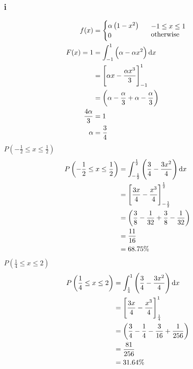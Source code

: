 \documentclass[11pt]{article}
\numberwithin{equation}{section}
\begin{document}
\subsubsection{i}
\begin{align}
    f(x) &= \begin{cases}
        \alpha \left(1 - x^2\right)\\
        0 
    \end{cases} \begin{array}{l}
        -1 \leq x \leq 1\\
        \textrm{otherwise}
    \end{array}\\
    F(x) = 1 &= \int_{-1}^1 \left(\alpha - \alpha x^2\right) \dif x\\
    &= \left[\alpha x - \frac{\alpha x^3}{3}\right]_{-1}^{1}\\
    &= \left(\alpha - \frac{\alpha}{3} + \alpha -\frac{\alpha}{3} \right)\\
    \frac{4\alpha}{3} &= 1\\
    \alpha &= \frac{3}{4}
\end{align}
$P\left(-\frac{1}{2} \leq x \leq \frac{1}{2} \right)$
\begin{align}
    P\left(-\frac{1}{2} \leq x \leq \frac{1}{2} \right) &= \int_{-\frac{1}{2}}^{\frac{1}{2}} \left(\frac{3}{4} - \frac{3x^2}{4}\right) \dif x\\
    &= \left[\frac{3x}{4} - \frac{x^3}{4}\right]_{-\frac{1}{2}}^{\frac{1}{2}}\\
    &= \left(\frac{3}{8} - \frac{1}{32} + \frac{3}{8} - \frac{1}{32} \right)\\
    &= \frac{11}{16}\\
    &= 68.75\%
\end{align}
$P\left(\frac{1}{4} \leq x \leq 2 \right)$
\begin{align}
    P\left(\frac{1}{4} \leq x \leq 2 \right) &= \int_{\frac{1}{4}}^{1} \left(\frac{3}{4} - \frac{3x^2}{4}\right) \dif x\\
    &= \left[\frac{3x}{4} - \frac{x^3}{4}\right]_{\frac{1}{4}}^{1}\\
    &= \left(\frac{3}{4} - \frac{1}{4} - \frac{3}{16} + \frac{1}{256} \right)\\
    &= \frac{81}{256}\\
    &= 31.64\%
\end{align}
\end{document}
